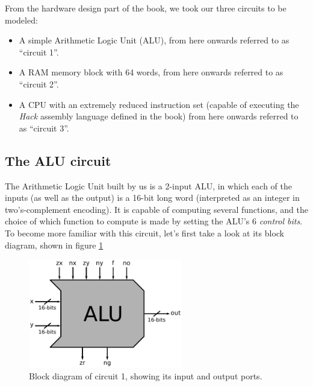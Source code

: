 \documentclass[a4paper]{article}
\begin{document}
        \newpage

        From the hardware design part of the book, we took our three circuits to be modeled:
        \begin{itemize}
            \item A simple Arithmetic Logic Unit (ALU), from here onwards referred to
                as ``circuit 1''.
            \item A RAM memory block with 64 words, from here onwards referred to as ``circuit 2''.
            \item A CPU with an extremely reduced instruction set (capable of executing the
                \emph{Hack} assembly language defined in the book) from here onwards referred to as
                ``circuit 3''.
        \end{itemize}

        \subsection{The ALU circuit}
        \label{subsec:circuit-alu}
            The Arithmetic Logic Unit built by us is a 2-input ALU, in which each of the inputs (as
            well as the output) is a 16-bit long word (interpreted as an integer in two's-complement
            encoding). It is capable of computing several functions, and the choice of which
            function to compute is made by setting the ALU's 6 \emph{control bits}. To become more
            familiar with this circuit, let's first take a look at its block diagram, shown in
            figure \ref{fig:alu-block}
            \begin{figure}[h]
                \begin{center}
                    \includegraphics[width=0.6\textwidth]{imgs/alu-block.pdf}
                \end{center}
                \label{fig:alu-block}
                \caption{Block diagram of circuit 1, showing its input and output ports.}
            \end{figure}
\end{document}
